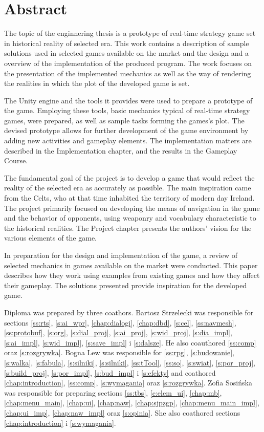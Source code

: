 \chapter*{Abstract}
The topic of the enginnering thesis is a prototype of real-time strategy game set in historical reality of selected era.
This work contains a description of sample solutions used in selected games available on the market
and the design and a overview of the implementation of the produced program. The work focuses on the presentation 
of the implemented mechanics as well as
the way of rendering the realities in which the plot of the developed game is set.

The Unity engine and the tools it provides were used to prepare a prototype of the game.
Employing these tools, basic mechanics typical of real-time strategy games, were prepared,
as well as sample tasks forming the games's plot. The devised prototype allows for 
further development of the game environment by adding new activities and gameplay elements.
The implementation matters are described in the Implementation chapter, and the results in the Gameplay Course.

The fundamental goal of the project is to develop a game that would reflect the reality of the selected era as accurately as possible.
The main inspiration came from the Celts, who at that time inhabited the territory of modern day Ireland. 
The project primarily focused on
developing the means of navigation in the game and the behavior of opponents, using weaponry and vocabulary characteristic to the
historical realities. The Project chapter presents the authors' vision for the various elements of the game.

In preparation for the design and implementation of the game, a review of selected mechanics in games available
on the market were conducted. This paper describes how they work using examples from existing games and how
they affect their gameplay. The solutions presented provide inspiration for the developed game.

Diploma was prepared by three coathors. Bartosz Strzelecki was responsible for sections \ref{ss:rts},
\ref{s:ai_wpr}, \ref{chap:dialogi}, \ref{chap:dbd}, \ref{s:cel}, \ref{ss:navmesh}, \ref{ss:protobuf}, \ref{s:org},
\ref{s:dial_proj}, \ref{s:ai_proj}, \ref{s:wid_proj}, \ref{s:dia_impl}, \ref{s:ai_impl}, \ref{s:wid_impl},
\ref{s:save_impl} i \ref{s:dalsze}. He also coauthored \ref{ss:comp} oraz \ref{s:rozgrywka}. Bogna Lew
was responsible for \ref{ss:rpg}, \ref{s:budowanie}, \ref{s:walka}, \ref{s:fabula}, \ref{s:silniki}, \ref{s:silniki},
\ref{ss:tTool}, \ref{ss:so}, \ref{s:swiat}, \ref{s:por_proj}, \ref{s:build_proj}, \ref{s:por_impl}, \ref{s:bud_impl} i
\ref{s:efekty} and coathored \ref{chap:introduction}, \ref{ss:comp}, \ref{s:wymagania} oraz \ref{s:rozgrywka}.
Zofia Sosińska was responsible for preparing sections \ref{ss:tbs}, \ref{c:elem_ui}, \ref{chap:mb},
\ref{chap:menu_main}, \ref{chap:ui}, \ref{chap:naw}, \ref{chap:sjpzgp}, \ref{chap:menu_main_impl}, \ref{chap:ui_imp},
\ref{chap:naw_impl} oraz \ref{s:opinia}. She also coathored sections \ref{chap:introduction} i \ref{s:wymagania}.